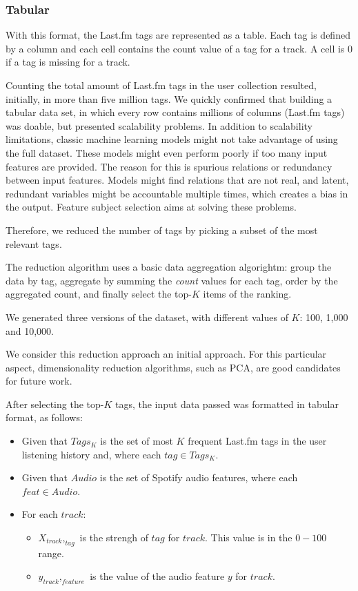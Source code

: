 \documentclass[sn-mathphys]{sn-jnl}%
\theoremstyle{thmstyleone}%
\theoremstyle{thmstyletwo}%
\theoremstyle{thmstylethree}%
\begin{document}
\subsubsection{Tabular}
With this format, the Last.fm tags are represented as a table.
Each tag is defined by a column and each cell contains the count value of a tag for a track.
A cell is 0 if a tag is missing for a track.

Counting the total amount of Last.fm tags in the user collection resulted, initially, in more than five million tags.
We quickly confirmed that building a tabular data set, in which every row contains millions of columns (Last.fm tags)
was doable, but presented scalability problems.
In addition to scalability limitations, classic machine learning models might not take advantage of using the full dataset.
These models might even perform poorly if too many input features are provided.
The reason for this is spurious relations or redundancy  between input features.
Models might find relations that are not real, and latent, redundant variables might be accountable multiple times, which creates a bias in the output.
Feature subject selection aims at solving these problems.


Therefore, we reduced the number of tags by picking a subset of the most relevant tags.

The reduction algorithm uses a basic data aggregation algorightm: group the data by tag, aggregate by summing the \emph{count} values for each tag,
order by the aggregated count, and finally select the top-$K$ items of the ranking.

We generated three versions of the dataset, with different values of $K$: 100, 1,000 and 10,000.

We consider this reduction approach an initial approach.
For this particular aspect, dimensionality reduction algorithms, such as PCA, are good candidates for future work.

After selecting the top-$K$ tags, the input data passed was formatted in tabular format, as follows:

\begin{itemize}
      \item Given that $Tags_{K}$ is the set of most $K$ frequent Last.fm tags in the user listening history
            and, where each $tag \in Tags_{K}$.
      \item Given that $Audio$ is the set of Spotify audio features, where each $feat \in Audio$.
      \item For each $track$:
      \begin{itemize}
            \item $X_{track},_{tag}$ is the strengh of $tag$ for $track$. This value is in the $0-100$ range.
            \item $y_{track},_{feature}$ is the value of the audio feature $y$ for $track$.
      \end{itemize}
\end{itemize}
\end{document}
